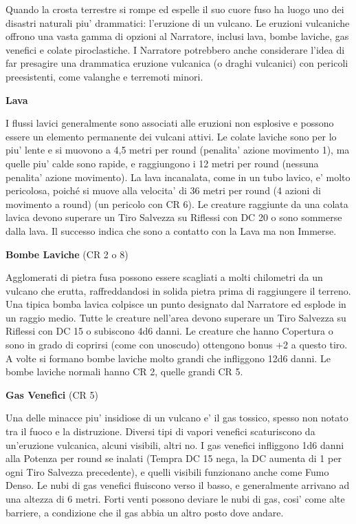 \documentclass[a4paper,11pt,twoside,openany]{book}
\begin{document}
Quando la crosta terrestre si rompe ed espelle il suo cuore fuso ha luogo uno dei disastri naturali piu' drammatici: l'eruzione di un vulcano. Le eruzioni vulcaniche offrono una vasta gamma di opzioni al Narratore, inclusi lava, bombe laviche, gas venefici e colate piroclastiche. I Narratore potrebbero anche considerare l'idea di far presagire una drammatica eruzione vulcanica (o draghi vulcanici) con pericoli preesistenti, come valanghe e terremoti minori.

\textbf{Lava}

I flussi lavici generalmente sono associati alle eruzioni non esplosive e possono essere un elemento permanente dei vulcani attivi. Le colate laviche sono per lo piu' lente e si muovono a 4,5 metri per round (penalita' azione movimento 1), ma quelle piu' calde sono rapide, e raggiungono i 12 metri per round (nessuna penalita' azione movimento). La lava incanalata, come in un tubo lavico, e' molto pericolosa, poiché si muove alla velocita' di 36 metri per round (4 azioni di movimento a round) (un pericolo con CR 6). Le creature raggiunte da una colata lavica devono superare un Tiro Salvezza su Riflessi con DC 20 o sono sommerse dalla lava. Il successo indica che sono a contatto con la Lava ma non Immerse.

\textbf{Bombe Laviche} (CR 2 o 8)

Agglomerati di pietra fusa possono essere scagliati a molti chilometri da un vulcano che erutta, raffreddandosi in solida pietra prima di raggiungere il terreno. Una tipica bomba lavica colpisce un punto designato dal Narratore ed esplode in un raggio medio. Tutte le creature nell'area devono superare un Tiro Salvezza su Riflessi con DC 15 o subiscono 4d6 danni. Le creature che hanno Copertura o sono in grado di coprirsi (come con uno­scudo) ottengono bonus +2 a questo tiro. A volte si formano bombe laviche molto grandi che infliggono 12d6 danni. Le bombe laviche normali hanno CR 2, quelle grandi CR 5.

\textbf{Gas Venefici} (CR 5)

Una delle minacce piu' insidiose di un vulcano e' il gas tossico, spesso non notato tra il fuoco e la distruzione. Diversi tipi di vapori venefici scaturiscono da un'eruzione vulcanica, alcuni visibili, altri no. I gas venefici infliggono 1d6 danni alla Potenza per round se inalati (Tempra DC 15 nega, la DC aumenta di 1 per ogni Tiro Salvezza precedente), e quelli visibili funzionano anche come Fumo Denso. Le nubi di gas venefici fluiscono verso il basso, e generalmente arrivano ad una altezza di 6 metri. Forti venti possono deviare le nubi di gas, cosi' come alte barriere, a condizione che il gas abbia un altro posto dove andare.
\end{document}
